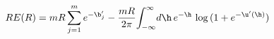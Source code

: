 \begin{equation}
R E(R) =
mR \sum_{j=1}^{m}
e^{-\b'_j}
-\frac{mR}{2\pi}\!\int_{-\infty}^{\infty}\!d\h\,
e^{-\h}\,\log{(1+e^{-\u'(\h)})}
\end{equation}

